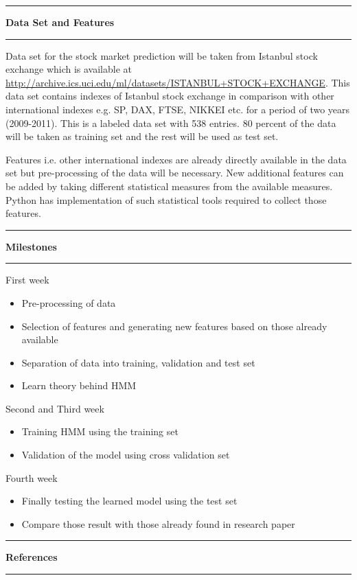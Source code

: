 \documentclass[11pt]{article}
\newcommand\question[1]{\vspace{.25in}\hrule\textbf{#1}\vspace{.5em}\hrule\vspace{.10in}}
\begin{document}
\question{Data Set and Features}

Data set for the stock market prediction will be taken from Istanbul stock
exchange which is available at
\url{http://archive.ics.uci.edu/ml/datasets/ISTANBUL+STOCK+EXCHANGE}. This data
set contains indexes of Istanbul stock exchange in comparison with other
international indexes e.g. SP, DAX, FTSE, NIKKEI etc. for a period of two years
(2009-2011). This is a labeled data set with 538 entries. 80 percent of the data
will be taken as training set and the rest will be used as test set.

Features i.e. other international indexes are already directly available in the
data set but pre-processing of the data will be necessary. New additional
features can be added by taking different statistical measures from the
available measures. Python has implementation of such statistical tools required
to collect those features.

\question{Milestones}

First week
\begin{itemize}
  \item Pre-processing of data
  \item Selection of features and generating new features based on those already
  available
  \item Separation of data into training, validation and test set
  \item Learn theory behind HMM
\end{itemize}

Second and Third week
\begin{itemize}
  \item Training HMM using the training set
  \item Validation of the model using cross validation set
\end{itemize}

Fourth week
\begin{itemize}
  \item Finally testing the learned model using the test set
  \item Compare those result with those already found in research paper
\end{itemize}

\question{References}
\end{document}
